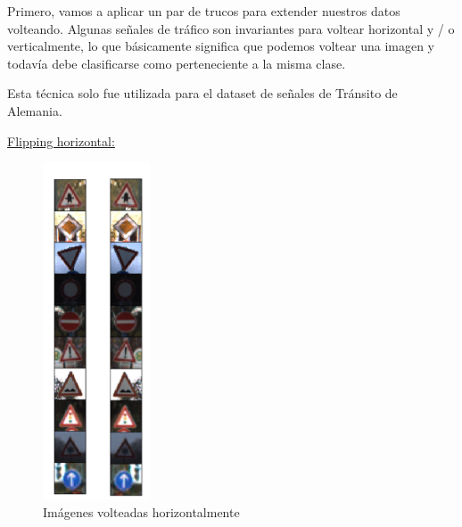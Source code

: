 			Primero, vamos a aplicar un par de trucos para extender nuestros datos volteando. Algunas señales de tráfico son invariantes para voltear horizontal y / o verticalmente, lo que básicamente significa que podemos voltear una imagen y todavía debe clasificarse como perteneciente a la misma clase.

			Esta técnica solo fue utilizada para el dataset de señales de Tránsito de Alemania.
			\begin{multicols}{2}
				\underline{Flipping horizontal:}
				\vspace{-0.5cm}
				\begin{figure}[H]
					\begin{center}
					\includegraphics[height=10cm ]{images/desarrollo/Augment/flippedHorizontally}
					\end{center}
					\begin{center}
					\caption{\small{Imágenes volteadas horizontalmente}}
					{\small{\fontsize{10}{16.8}\selectfont {Fuente: Elaboración propia}}}
					\end{center}
					\vspace{-1.5em}
				\end{figure}

			

\end{multicols}
